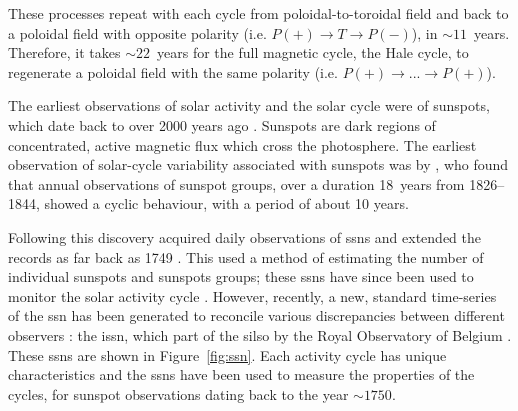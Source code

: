 

These processes repeat with each cycle from poloidal-to-toroidal field and back to a poloidal field with opposite polarity (i.e. $P(+)\rightarrow T\rightarrow P(-)$), in $\sim11$~years. Therefore, it takes $\sim22$~years for the full magnetic cycle, the Hale cycle, to regenerate a poloidal field with the same polarity (i.e. $P(+)\rightarrow ...\rightarrow P(+)$).

The earliest observations of solar activity and the solar cycle were of sunspots, which date back to over 2000 years ago \citep{clark_interpretation_1978}. Sunspots are dark regions of concentrated, active magnetic flux which cross the photosphere. The earliest observation of solar-cycle variability associated with sunspots was by \citet{schwabe_sonnenbeobachtungen_1844}, who found that annual observations of sunspot groups, over a duration 18~years from 1826--1844, showed a cyclic behaviour, with a period of about 10 years.

Following this discovery \citet{wolf_mittheilungen_1856, wolf_extract_1859} acquired daily observations of \glspl{ssn} and extended the records as far back as 1749 \citep{hathaway_solar_2015}. This used a method of estimating the number of individual sunspots and sunspots groups; these \glspl{ssn} have since been used to monitor the solar activity cycle \citep{wolf_extract_1859, wolf_abstract_1861}. However, recently, a new, standard time-series of the \gls{ssn} has been generated to reconcile various discrepancies between different observers \citep{clette_preface_2016,clette_new_2016}: the \gls{issn}, which part of the \gls{silso} by the Royal Observatory of Belgium \citep{silso_world_data_center_international_2020}. These \glspl{ssn} are shown in Figure~\ref{fig:ssn}. Each activity cycle has unique characteristics and the \glspl{ssn} have been used to measure the properties of the cycles, for sunspot observations dating back to the year $\sim1750$.

